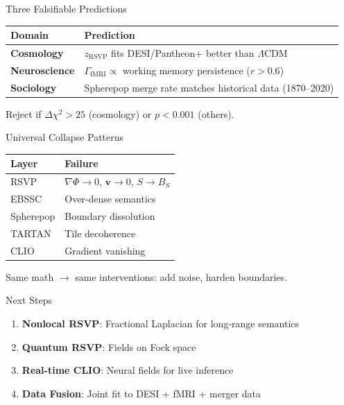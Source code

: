 \documentclass{beamer}
\begin{document}
\begin{frame}{Three Falsifiable Predictions}
\begin{table}[]
\begin{tabular}{l|l}
\toprule
\textbf{Domain} & \textbf{Prediction} \\
\midrule
\textbf{Cosmology} & $z_{\mathrm{RSVP}}$ fits DESI/Pantheon+ better than $\Lambda$CDM \\
\textbf{Neuroscience} & $\Gamma_{\mathrm{fMRI}} \propto$ working memory persistence ($r>0.6$) \\
\textbf{Sociology} & Spherepop merge rate matches historical data (1870--2020) \\
\bottomrule
\end{tabular}
\end{table}
\vspace{0.5em}
\alert{Reject if $\Delta\chi^2 > 25$ (cosmology) or $p < 0.001$ (others).}
\end{frame}

\begin{frame}{Universal Collapse Patterns}
\begin{table}[]
\begin{tabular}{l|l}
\toprule
\textbf{Layer} & \textbf{Failure} \\
\midrule
RSVP & $\nabla\Phi \to 0$, $\mathbf{v} \to 0$, $S \to B_S$ \\
EBSSC & Over-dense semantics \\
Spherepop & Boundary dissolution \\
TARTAN & Tile decoherence \\
CLIO & Gradient vanishing \\
\bottomrule
\end{tabular}
\end{table}
\vspace{0.5em}
\alert{Same math $\to$ same interventions: add noise, harden boundaries.}
\end{frame}

\begin{frame}{Next Steps}
\begin{enumerate}
\item \textbf{Nonlocal RSVP}: Fractional Laplacian for long-range semantics
\item \textbf{Quantum RSVP}: Fields on Fock space
\item \textbf{Real-time CLIO}: Neural fields for live inference
\item \textbf{Data Fusion}: Joint fit to DESI + fMRI + merger data
\end{enumerate}
\end{frame}
\end{document}
